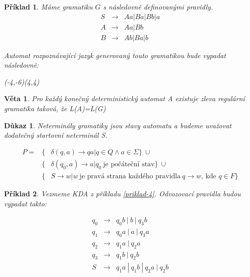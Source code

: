 \documentclass[10pt, a4paper, titlepage]{article}
\theoremstyle{note}
\newtheorem{veta}{\textbf{Věta}}
\newtheorem{dukaz}{\textbf{Důkaz}}
\newtheorem{priklad}{\textbf{Příklad}}
\begin{document}
\begin{priklad}
Máme gramatiku $G$ s následovně definovanými pravidly.
\begin{eqnarray*}
S &\rightarrow& Aa|Ba|Bb|a \\
A &\rightarrow& Aa|Bb \\
B &\rightarrow& Ab|Ba|b
\end{eqnarray*}

Automat rozpoznávající jazyk generovaný touto gramatikou bude vypadat následovně:

\begin{center}
\begin{VCPicture}{(-4,-6)(4,4)}
\end{VCPicture}
\end{center}

\end{priklad}

\begin{veta}
Pro každý konečný deterministický automat \textit{A} existuje zleva regulární gramatika taková, že \textit{L(A)=L(G)}
\end{veta}

\begin{dukaz}
Neterminály gramatiky jsou stavy automatu a budeme uvažovat dodatečný startovní neterminál S.

\begin{eqnarray*}
P = &\lbrace& \delta (q,a) \rightarrow qa | q \in Q \wedge a \in \Sigma \rbrace \ \cup \\
&\lbrace& \delta (q_0,a) \rightarrow a | q_0\ \text{je počáteční stav} \rbrace \ \cup \\
&\lbrace& S \rightarrow w|w \ \text{je pravá strana každého pravidla}\ q \rightarrow w\text{, kde } q \in F \rbrace
\end{eqnarray*}

\end{dukaz}

\begin{priklad}
Vezmeme KDA z příkladu \ref{priklad-4}.
Odvozovací pravidla budou vypadat takto:

\begin{eqnarray*}
q_0 &\rightarrow& q_{0}b\ |\ b\ |\ q_{3}b \\
q_1 &\rightarrow& q_{0}a\ |\ a\ |\ q_{3}a \\
q_2 &\rightarrow& q_{1}a\ |\ q_{2}a \\
q_3 &\rightarrow& q_{1}b\ |\ q_{2}b \\
S &\rightarrow& q_{1}a\ |\ q_{1}b\ |\ q_{2}a\ |\ q_{2}b \\
\end{eqnarray*}

\end{priklad}
\end{document}
